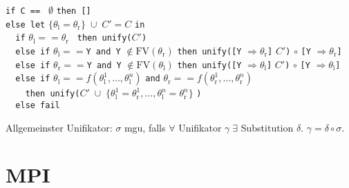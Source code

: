 \documentclass[11pt]{scrartcl}
\begin{document}
\texttt{if C == } \( \emptyset \) \texttt{then [] \\
else let} \( \{ \theta_\textrm{l} = \theta_\textrm{r} \} \; \cup \; C' = C \) \texttt{in} \\
\mbox{\texttt{~~if}} \( \theta_\textrm{l} == \theta_\textrm{r} \) 
\texttt{ then unify(}\( C' \)\texttt{)} \\
\mbox{\texttt{~~else if}} \( \theta_\textrm{l} == \)\texttt{Y and Y} 
\( \notin \textrm{FV} ( \theta_\textrm{r} ) \) \texttt{then unify([Y} \( \Rightarrow 
\theta_\textrm{r} \)\texttt{]} \( C' \)\texttt{)} \( \circ \) \texttt{[Y} \( \Rightarrow 
\theta_\textrm{r} \)\texttt{]} \\
\mbox{\texttt{~~else if}} \( \theta_\textrm{r} == \)\texttt{Y and Y} 
\( \notin \textrm{FV} ( \theta_\textrm{l} ) \) \texttt{then unify([Y} \( \Rightarrow 
\theta_\textrm{l} \)\texttt{]} \( C' \)\texttt{)} \( \circ \) \texttt{[Y} \( \Rightarrow 
\theta_\textrm{l} \)\texttt{]} \\
\mbox{\texttt{~~else if}} \( \theta_\textrm{l} == f ( \theta_\textrm{l}^1, \dots, 
\theta_\textrm{l}^n ) \) \texttt{and} \( \theta_\textrm{r} == f ( \theta_\textrm{r}^1, \dots, 
\theta_\textrm{r}^n ) \) \\
\mbox{\texttt{~~~~then unify(}}\( C' \; \cup \; \{ \theta_\textrm{l}^1 = \theta_\textrm{r}^1, 
\dots, \theta_\textrm{l}^n = \theta_\textrm{r}^n \} \) \texttt{)} \\
\mbox{\texttt{~~else fail}}

\noindent
Allgemeinster Unifikator: \( \sigma \) mgu, falls \( \forall \) Unifikator \( \gamma \; \exists \) Substitution \( \delta \). \( \gamma = \delta \circ \sigma \).

\section{MPI}
\end{document}

